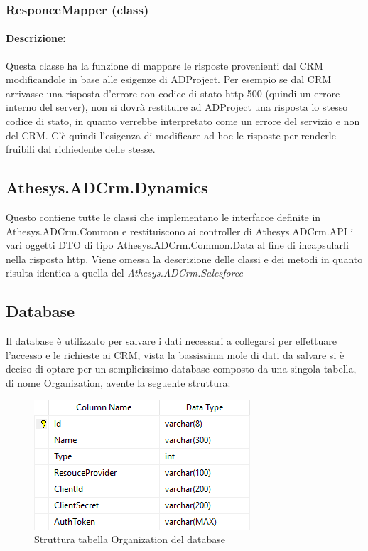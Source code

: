 \subsubsection{ResponceMapper (class)}\label{responceMapperClass}
\paragraph{Descrizione:}
Questa classe ha la funzione di mappare le risposte provenienti dal CRM modificandole in base alle esigenze di ADProject.
Per esempio se dal CRM arrivasse una risposta d'errore con codice di stato http 500 (quindi un errore interno del server), non si dovrà restituire ad ADProject una risposta lo stesso codice di stato, in quanto verrebbe interpretato come un errore del servizio e non del CRM. C'è quindi l'esigenza di modificare ad-hoc le risposte per renderle fruibili dal richiedente delle stesse.

\subsection{Athesys.ADCrm.Dynamics}
Questo  contiene tutte le classi che implementano le interfacce definite in Athesys.ADCrm.Common e restituiscono ai controller di Athesys.ADCrm.API i vari oggetti DTO di tipo Athesys.ADCrm.Common.Data al fine di incapsularli nella risposta http.
Viene omessa la descrizione delle classi e dei metodi in quanto risulta identica a quella del  \textit{Athesys.ADCrm.Salesforce}

\subsection{Database}
Il database è utilizzato per salvare i dati necessari a collegarsi per effettuare l'accesso e le richieste ai CRM, vista la bassissima mole di dati da salvare si è deciso di optare per un semplicissimo database  composto da una singola tabella, di nome Organization, avente la seguente struttura:
\begin{figure}[H]
	\centering
	\includegraphics[width=0.7\linewidth]{images/schemaDB}
	\caption{Struttura tabella Organization del database}
	\label{fig:schemadb}
\end{figure}

